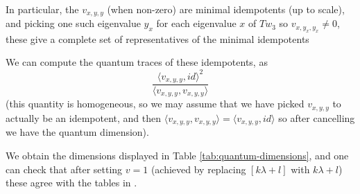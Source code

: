 \documentclass[12pt]{amsart}
\begin{document}
In particular, the $v_{x,y,y}$ (when non-zero) are minimal idempotents (up to scale), and picking one
such eigenvalue $y_x$ for each eigenvalue $x$ of $Tw_3$ so $v_{x,y_x,y_x} \neq 0$, these give a complete
set of representatives of the minimal idempotents

We can compute the quantum traces of these idempotents, as
$$\frac{\langle v_{x,y,y}, id \rangle^2}{\langle v_{x,y,y}, v_{x,y,y} \rangle}$$
(this quantity is homogeneous, so we may assume that we have picked $v_{x,y,y}$ to actually be an idempotent, and then $\langle v_{x,y,y}, v_{x,y,y} \rangle = \langle v_{x,y,y}, id \rangle$ so after
cancelling we have the quantum dimension).

We obtain the dimensions displayed in Table \ref{tab:quantum-dimensions},
and one can check that after setting $v=1$ (achieved by replacing $[k\lambda+l]$ with $k\lambda+l$) these agree
with the tables in \cite[p.431]{MR1381778}.
\end{document}
